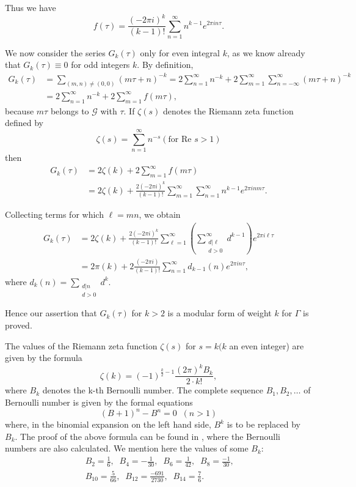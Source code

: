 Thus we have 
$$
f(\tau) = \frac{(-2\pi i)^k}{(k-1)!} \sum^{\infty}_{n=1} n^{k-1}
e^{2\pi i n \tau}.
$$

We now consider the series $G_k(\tau)$ only for even integral $k$, as
we know already that $G_k(\tau) \equiv 0$ for odd integers $k$. By
definition,
\begin{align*}
G_k (\tau) & = \sum_{(m,n) \neq (0,0)} (m\tau+n)^{-k} = 2 \sum^{\infty}_{n=1}
 n^{-k} + 2 \sum^{\infty}_{m=1} \sum^{\infty}_{n=-\infty}
 (m\tau+n)^{-k}\\
& = 2 \sum^{\infty}_{n=1} n^{-k} + 2 \sum^{\infty}_{m=1}
 f(m\tau),
\end{align*}
because $m\tau$ belongs to $\mathscr{G}$ with $\tau$. If $\zeta(s)$
denotes the Riemann zeta function defined by 
$$
\zeta(s) = \sum^{\infty}_{n=1} n^{-s} (\text{for } \text{Re } s>1)
$$
then 
\begin{align*}
G_k(\tau) & = 2 \zeta(k) + 2 \sum^{\infty}_{m=1} f(m\tau)\\
& = 2\zeta(k) + \frac{2(-2\pi i)^k}{(k-1)!} \sum^{\infty}_{m=1}
\sum^{\infty}_{n=1} n^{k-1} e^{2\pi i n m \tau}.
\end{align*}

Collecting \pageoriginale terms for which $\ell=mn$, we obtain 
\begin{align*}
G_k(\tau) & = 2\zeta (k) + \frac{2(-2\pi i)^k}{(k-1)!}
\sum^{\infty}_{\ell=1} \left(\sum^{\infty}_{\substack{d|\ell\\d>0}}
d^{k-1}\right) e^{2\pi i \ell \tau}\\
& = 2 \pi (k) + 2 \frac{(-2\pi i)}{(k-1)!} \sum^{\infty}_{n=1}
d_{k-1}(n) e^{2\pi i n \tau},
\end{align*}
where $d_k(n) = \sum_{\substack{d|n\\d>0}}d^k$.

Hence our assertion that $G_k(\tau)$ for $k>2$ is a modular form of
weight $k$ for $\Gamma$ is proved. 

The values of the Riemann zeta function $\zeta(s)$ for $s=k(k$ an even
integer) are given by the formula
$$
\zeta(k)= (-1)^{\frac{k}{2}-1} \frac{(2\pi)^kB_k}{2\cdot k!},
$$
where $B_k$ denotes the k-th Bernoulli number. The complete sequence
$B_1, B_2, \ldots $ of Bernoulli number is given by the formal
equations
$$
(B+1)^n -B^n =0 \;\; (n>1)
$$
where, in the binomial expansion on the left hand side, $B^k$ is to be
replaced by $B_k$. The proof of the above formula can be found in
\cite{c2:key6}, where the Bernoulli numbers are also calculated. We mention
here the values of some $B_k$:
\begin{align*}
&B_2 = \frac{1}{6}, \;\; B_4 = - \frac{1}{30}, \;\; B_6 =\frac{1}{42},
\;\; B_8 = \frac{-1}{30}, \;\;\\
&B_{10} = \frac{5}{66}, \;\; B_{12} = 
\frac{-691}{2730}, \;\; B_{14} =\frac{7}{6}. 
\end{align*}

